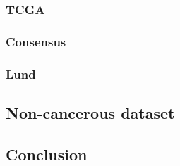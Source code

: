 \subsubsection{TCGA}








\subsubsection{Consensus}

\subsubsection{Lund}



\subsection{Non-cancerous dataset}




\subsection{Conclusion}

